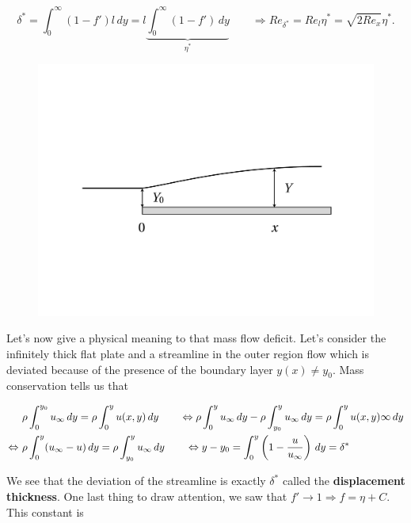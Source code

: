 			\begin{equation}
				\delta ^* = \int _0^\infty (1- f') l\, dy = l\underbrace{\int _0^\infty (1-f') \, dy}_{\eta ^*}\qquad \Rightarrow Re_{\delta ^*} = Re_{l}\eta ^* = \sqrt{2Re_x}\eta ^* .
			\end{equation}
			
			\begin{figure}
			\vspace{-5mm}
			\includegraphics[scale=0.23]{ch5/9}
			\label{fig:5.9}
			\end{figure}
			Let's now give a physical meaning to that mass flow deficit. Let's consider the infinitely thick flat plate and a streamline in the outer region flow which is deviated because of the presence of the boundary layer $y(x) \neq y_0$. Mass conservation tells us that 
			
			\begin{equation}
			\begin{aligned}
				&\rho \int _0^{y_0} u_\infty \, dy =  \rho \int _0^y u(x,y) \, dy \qquad \Leftrightarrow \rho \int _0^{y} u_\infty \, dy - \rho \int _{y_0}^{y} u_\infty \, dy = \rho \int _0^y u(x,y)\infty \, dy \\
				\Leftrightarrow \ &\rho \int _0^{y} (u_\infty - u) \, dy = \rho \int _{y_0}^{y} u_\infty \, dy \qquad \Leftrightarrow y-y_0 = \int _0^{y} \left(1 -\frac{u}{u_\infty}\right)\, dy = \delta ^*
			\end{aligned}
			\end{equation}
			
			We see that the deviation of the streamline is exactly $\delta ^*$ called the \textbf{displacement thickness}. One last thing to draw attention, we saw that $f'  \rightarrow 1 \Rightarrow f = \eta + C$. This constant is 
			

